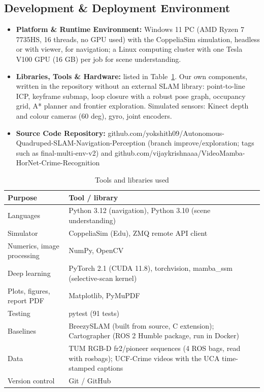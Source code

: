 \documentclass[11pt, a4paper]{article}
\begin{document}
\subsection{Development \& Deployment Environment}
\begin{itemize}[noitemsep, topsep=2pt]
    \item \textbf{Platform \& Runtime Environment:} Windows 11 PC (AMD Ryzen 7 7735HS, 16 threads, no GPU used) with the CoppeliaSim simulation, headless or with viewer, for navigation; a Linux computing cluster with one Tesla V100 GPU (16 GB) per job for scene understanding.
    \item \textbf{Libraries, Tools \& Hardware:} listed in Table~\ref{tab:tools}. Our own components, written in the repository without an external SLAM library: point-to-line ICP, keyframe submap, loop closure with a robust pose graph, occupancy grid, A* planner and frontier exploration. Simulated sensors: Kinect depth and colour cameras (60 deg), gyro, joint encoders.
    \item \textbf{Source Code Repository:} github.com/yokshith09/Autonomous-Quadruped-SLAM-Navigation-Perception (branch improve/exploration; tags such as final-multi-env-v2) and github.com/vijaykrishnaaa/VideoMamba-HorNet-Crime-Recognition
\end{itemize}

\begin{table}[H]
    \centering
    \footnotesize
    \renewcommand{\arraystretch}{1.2}
    \begin{tabular}{|p{4.0cm}|p{10.6cm}|}
        \hline
        \textbf{Purpose} & \textbf{Tool / library} \\
        \hline
        Languages & Python 3.12 (navigation), Python 3.10 (scene understanding) \\
        \hline
        Simulator & CoppeliaSim (Edu), ZMQ remote API client \\
        \hline
        Numerics, image processing & NumPy, OpenCV \\
        \hline
        Deep learning & PyTorch 2.1 (CUDA 11.8), torchvision, mamba\_ssm (selective-scan kernel) \\
        \hline
        Plots, figures, report PDF & Matplotlib, PyMuPDF \\
        \hline
        Testing & pytest (91 tests) \\
        \hline
        Baselines & BreezySLAM (built from source, C extension); Cartographer (ROS 2 Humble package, run in Docker) \\
        \hline
        Data & TUM RGB-D fr2/pioneer sequences (4 ROS bags, read with rosbags); UCF-Crime videos \cite{sultani2018} with the UCA time-stamped captions \cite{yuan2024} \\
        \hline
        Version control & Git / GitHub \\
        \hline
    \end{tabular}
    \caption{Tools and libraries used}
    \label{tab:tools}
\end{table}
\end{document}
